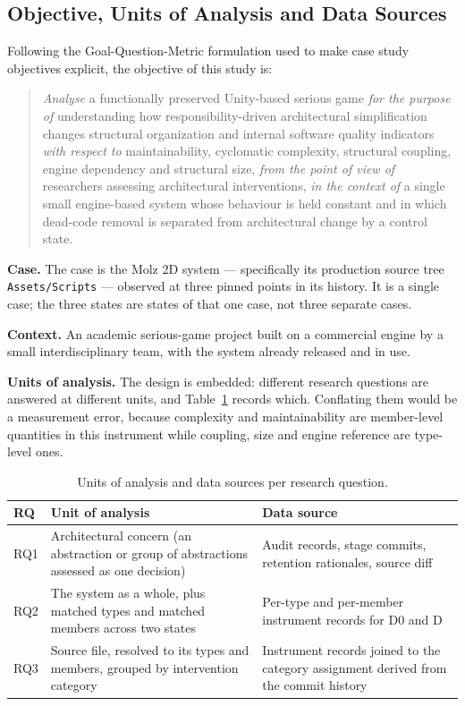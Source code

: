 \documentclass{sbc2019}%
\begin{document}
\subsection{Objective, Units of Analysis and Data Sources}

Following the Goal-Question-Metric formulation used to make case study objectives
explicit, the objective of this study is:

\begin{quote}
\emph{Analyse} a functionally preserved Unity-based serious game \emph{for the
purpose of} understanding how responsibility-driven architectural simplification
changes structural organization and internal software quality indicators
\emph{with respect to} maintainability, cyclomatic complexity, structural
coupling, engine dependency and structural size, \emph{from the point of view of}
researchers assessing architectural interventions, \emph{in the context of} a
single small engine-based system whose behaviour is held constant and in which
dead-code removal is separated from architectural change by a control state.
\end{quote}

\textbf{Case.} The case is the Molz 2D system --- specifically its production
source tree \texttt{Assets/Scripts} --- observed at three pinned points in its
history. It is a single case; the three states are states of that one case, not
three separate cases.

\textbf{Context.} An academic serious-game project built on a commercial engine
by a small interdisciplinary team, with the system already released and in use.

\textbf{Units of analysis.} The design is embedded: different research questions
are answered at different units, and Table~\ref{tab:units} records which.
Conflating them would be a measurement error, because complexity and
maintainability are member-level quantities in this instrument while coupling,
size and engine reference are type-level ones.

\begin{table}[!htbp]
\centering
\caption{Units of analysis and data sources per research question.}\label{tab:units}
\small
\begin{tabular}{p{}p{}p{}}
\toprule
\textbf{RQ} & \textbf{Unit of analysis} & \textbf{Data source} \\
\midrule
RQ1 & Architectural concern (an abstraction or group of abstractions assessed as
one decision) & Audit records, stage commits, retention rationales, source diff \\
\addlinespace
RQ2 & The system as a whole, plus matched types and matched members across two
states & Per-type and per-member instrument records for D0 and D \\
\addlinespace
RQ3 & Source file, resolved to its types and members, grouped by intervention
category & Instrument records joined to the category assignment derived from the
commit history \\
\bottomrule
\end{tabular}
\end{table}
\end{document}
